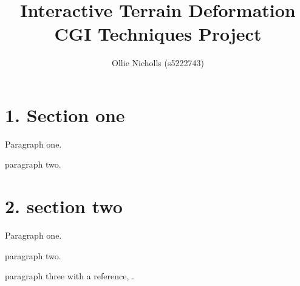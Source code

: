 \documentclass[12pt]{report}
\title{%
Interactive Terrain Deformation \\
\large CGI Techniques Project}
\author{Ollie Nicholls (s5222743)}
\date{}
\begin{document}
\maketitle

\section*{1. Section one }

Paragraph one.


paragraph two.

\section*{2. section two }

Paragraph one.


paragraph two.


paragraph three with a reference, \cite{test}.


\end{document}
